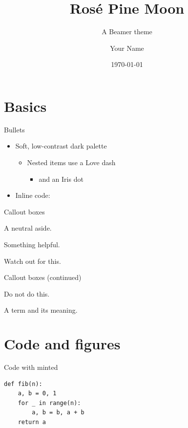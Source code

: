 \documentclass[aspectratio=169]{beamer}
\title{Rosé Pine Moon}
\subtitle{A Beamer theme}
\author{Your Name}
\date{\today}
\begin{document}
\begin{frame}
  \titlepage
\end{frame}

\section{Basics}

\begin{frame}{Bullets}
  \begin{itemize}
    \item Soft, low-contrast dark palette
    \begin{itemize}
      \item Nested items use a Love dash
      \begin{itemize}\item and an Iris dot\end{itemize}
    \end{itemize}
    \item Inline code: 
  \end{itemize}
\end{frame}

\begin{frame}{Callout boxes}
  \begin{notebox}[Note] A neutral aside. \end{notebox}
  \begin{tip}[Tip] Something helpful. \end{tip}
  \begin{warning}[Warning] Watch out for this. \end{warning}
\end{frame}

\begin{frame}{Callout boxes (continued)}
  \begin{dangerbox}[Danger] Do not do this. \end{dangerbox}
  \begin{defbox}[Definition] A term and its meaning. \end{defbox}
\end{frame}

\section{Code and figures}

\begin{frame}[fragile]{Code with minted}
\begin{verbatim}
def fib(n):
    a, b = 0, 1
    for _ in range(n):
        a, b = b, a + b
    return a
\end{verbatim}
\end{frame}
\end{document}
